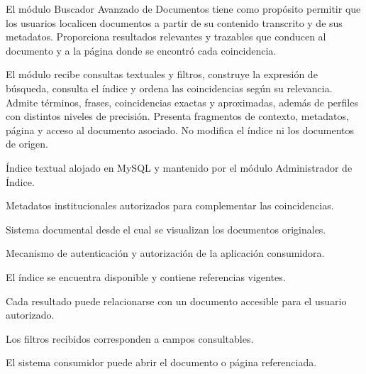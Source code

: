 \begin{definicionmodulo}

\item[Propósito] El módulo Buscador Avanzado de Documentos tiene como propósito permitir que los usuarios localicen documentos a partir de su contenido transcrito y de sus metadatos. Proporciona resultados relevantes y trazables que conducen al documento y a la página donde se encontró cada coincidencia.

\item[Alcance] El módulo recibe consultas textuales y filtros, construye la expresión de búsqueda, consulta el índice y ordena las coincidencias según su relevancia. Admite términos, frases, coincidencias exactas y aproximadas, además de perfiles con distintos niveles de precisión. Presenta fragmentos de contexto, metadatos, página y acceso al documento asociado. No modifica el índice ni los documentos de origen.

\item[Dependencias]
\begin{elementosmodulo}
    \item Índice textual alojado en MySQL y mantenido por el módulo Administrador de Índice.
    \item Metadatos institucionales autorizados para complementar las coincidencias.
    \item Sistema documental desde el cual se visualizan los documentos originales.
    \item Mecanismo de autenticación y autorización de la aplicación consumidora.
\end{elementosmodulo}

\item[Supuestos]
\begin{elementosmodulo}
    \item El índice se encuentra disponible y contiene referencias vigentes.
    \item Cada resultado puede relacionarse con un documento accesible para el usuario autorizado.
    \item Los filtros recibidos corresponden a campos consultables.
    \item El sistema consumidor puede abrir el documento o página referenciada.
\end{elementosmodulo}


\end{definicionmodulo}
